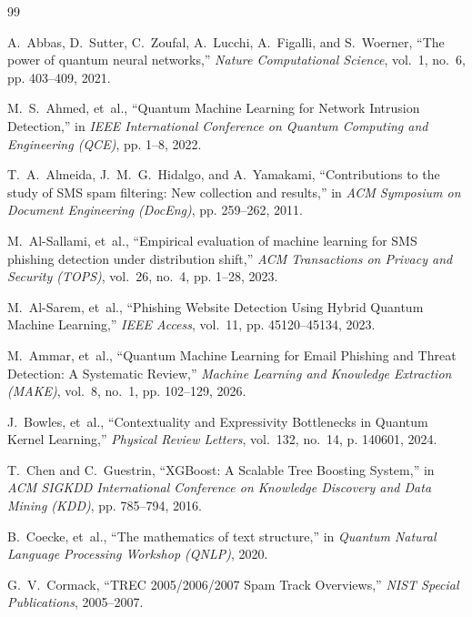 \documentclass{article}
\begin{document}
\begin{thebibliography}{99}
\setlength{\itemsep}{2pt}

A.~Abbas, D.~Sutter, C.~Zoufal, A.~Lucchi, A.~Figalli, and S.~Woerner,
\newblock ``The power of quantum neural networks,''
\newblock \emph{Nature Computational Science}, vol.~1, no.~6, pp. 403--409, 2021.

M.~S.~Ahmed, et~al.,
\newblock ``Quantum Machine Learning for Network Intrusion Detection,''
\newblock in \emph{IEEE International Conference on Quantum Computing and Engineering (QCE)}, pp. 1--8, 2022.

T.~A.~Almeida, J.~M.~G.~Hidalgo, and A.~Yamakami,
\newblock ``Contributions to the study of SMS spam filtering: New collection and results,''
\newblock in \emph{ACM Symposium on Document Engineering (DocEng)}, pp. 259--262, 2011.

M.~Al-Sallami, et~al.,
\newblock ``Empirical evaluation of machine learning for SMS phishing detection under distribution shift,''
\newblock \emph{ACM Transactions on Privacy and Security (TOPS)}, vol.~26, no.~4, pp. 1--28, 2023.

M.~Al-Sarem, et~al.,
\newblock ``Phishing Website Detection Using Hybrid Quantum Machine Learning,''
\newblock \emph{IEEE Access}, vol.~11, pp. 45120--45134, 2023.

M.~Ammar, et~al.,
\newblock ``Quantum Machine Learning for Email Phishing and Threat Detection: A Systematic Review,''
\newblock \emph{Machine Learning and Knowledge Extraction (MAKE)}, vol.~8, no.~1, pp. 102--129, 2026.

J.~Bowles, et~al.,
\newblock ``Contextuality and Expressivity Bottlenecks in Quantum Kernel Learning,''
\newblock \emph{Physical Review Letters}, vol.~132, no.~14, p. 140601, 2024.

T.~Chen and C.~Guestrin,
\newblock ``XGBoost: A Scalable Tree Boosting System,''
\newblock in \emph{ACM SIGKDD International Conference on Knowledge Discovery and Data Mining (KDD)}, pp. 785--794, 2016.

B.~Coecke, et~al.,
\newblock ``The mathematics of text structure,''
\newblock in \emph{Quantum Natural Language Processing Workshop (QNLP)}, 2020.

G.~V.~Cormack,
\newblock ``TREC 2005/2006/2007 Spam Track Overviews,''
\newblock \emph{NIST Special Publications}, 2005--2007.


\end{thebibliography}
\end{document}
